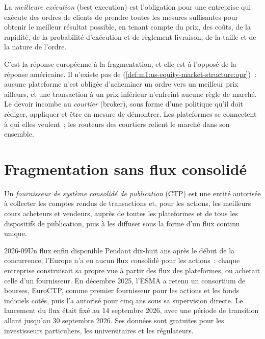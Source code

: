 \begin{definition}\label{def:m1:european-equity-market-structure:bestex}
La \emph{meilleure exécution} (best execution) est l'obligation
pour une entreprise qui exécute des ordres de clients de prendre toutes les mesures suffisantes pour obtenir le meilleur
résultat possible, en tenant compte du prix, des coûts, de la rapidité, de la probabilité d'exécution
et de règlement-livraison, de la taille et de la nature de l'ordre.
\end{definition}

C'est la réponse européenne à la fragmentation, et elle est à l'opposé de la
réponse américaine. Il n'existe pas de 
(\cref{def:m1:us-equity-market-structure:opr})~: aucune plateforme n'est obligée d'acheminer un ordre
vers un meilleur prix ailleurs, et une transaction à un prix inférieur n'enfreint aucune
règle de marché. Le devoir incombe au \emph{courtier} (broker), sous forme d'une politique qu'il doit rédiger,
appliquer et être en mesure de démontrer. Les plateformes se connectent à qui elles veulent~; les routeurs des
courtiers relient le marché dans son ensemble.

\section{Fragmentation sans flux consolidé}

\begin{definition}\label{def:m1:european-equity-market-structure:ctp}
Un \emph{fournisseur de système consolidé de publication} (CTP)
est une entité autorisée à collecter les comptes rendus de transactions et, pour les actions, les meilleurs
cours acheteurs et vendeurs, auprès de toutes les plateformes et de tous les dispositifs de publication, puis
à les diffuser sous la forme d'un flux continu unique.
\end{definition}

\begin{dated}{2026-09}{Un flux enfin disponible}\label{dat:m1:european-equity-market-structure:ctp}
Pendant dix-huit ans après le début de la concurrence, l'Europe n'a eu aucun flux consolidé
pour les actions~: chaque entreprise construisait sa propre vue à partir des flux des plateformes, ou
achetait celle d'un fournisseur. En décembre 2025, l'ESMA a retenu un consortium de bourses, EuroCTP,
comme premier fournisseur pour les actions et les fonds indiciels cotés, puis l'a autorisé
pour cinq ans sous sa supervision directe. Le lancement du flux était fixé
au 14 septembre 2026, avec une période de transition allant jusqu'au 30 septembre
2026. Ses données sont gratuites pour les investisseurs particuliers, les universitaires et les
régulateurs.
\end{dated}

